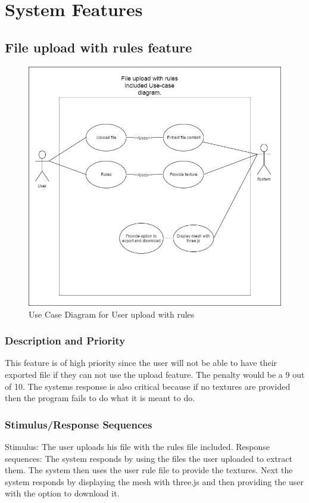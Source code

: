 \documentclass[english]{article}
\begin{document}
	\section{System Features}		
		\subsection{File upload with rules feature}
		\begin{figure}[h]
			\includegraphics[width=\textwidth]{rules.jpg}
			\caption{Use Case Diagram for User upload with rules }
		\end{figure}

			 \subsubsection{Description and Priority}
			 	This feature is of high priority since the user will not be able to have their exported file if they can not use the upload feature. The penalty would be a 9 out of 10. The systems response is also critical because if no textures are provided then the program fails to do what it is meant to do.
			 \subsubsection{Stimulus/Response Sequences}
			 	Stimulus: The user uploads his file with the rules file included.
			 	Response sequences: The system responds by using the files the user uploaded to extract them. The system then uses the user rule file to provide the textures. Next the system responds by displaying the mesh with three.js and then providing the user with the option to download it. 
\end{document}
